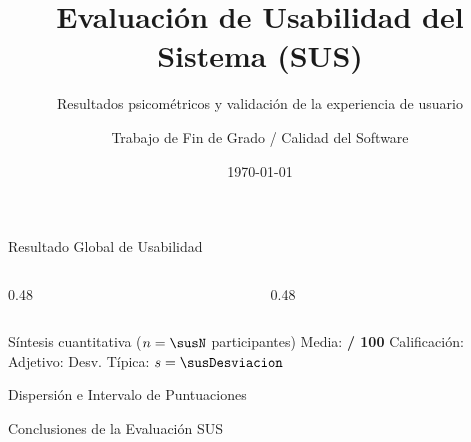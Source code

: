 \documentclass[10pt,aspectratio=169]{beamer}
\title[Evaluación SUS]{Evaluación de Usabilidad del Sistema (SUS)}
\subtitle{Resultados psicométricos y validación de la experiencia de usuario}
\author{Trabajo de Fin de Grado / Calidad del Software}
\date{\today}
\begin{document}
\begin{frame}
  \titlepage
\end{frame}

\begin{frame}{Resultado Global de Usabilidad}
  \begin{columns}[c]
    \begin{column}{0.48\textwidth}
      \centering
      \scalebox{0.78}{}
    \end{column}
    \begin{column}{0.48\textwidth}
      \centering
      \scalebox{0.78}{}
    \end{column}
  \end{columns}

  \vspace{0.4cm}
  \begin{block}{Síntesis cuantitativa ($n = \susN$ participantes)}
    \centering
    Media: \textbf{\susMedia{} / 100} \quad\textbar\quad
    Calificación: \textbf{\susNotaMedia} \quad\textbar\quad
    Adjetivo: \textbf{\susAdjetivoMedia} \quad\textbar\quad
    Desv. Típica: \textbf{$s = \susDesviacion$}
  \end{block}
\end{frame}

\begin{frame}{Dispersión e Intervalo de Puntuaciones}
  \begin{center}
    \scalebox{0.82}{}
  \end{center}

  \vspace{0.2cm}
  \begin{center}
    \scalebox{0.72}{}
  \end{center}
\end{frame}

\begin{frame}{Conclusiones de la Evaluación SUS}
  \begin{itemize}
  \end{itemize}
\end{frame}
\end{document}
